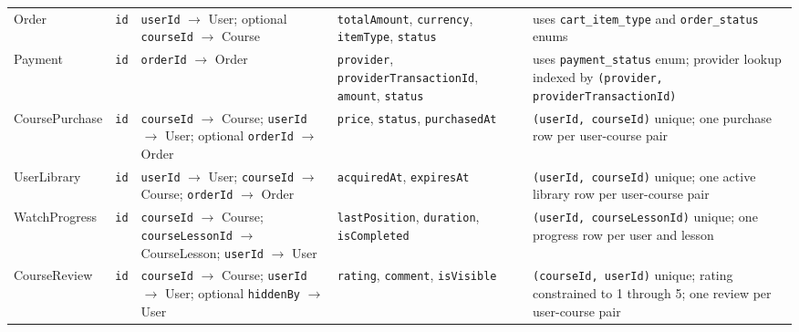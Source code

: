 \begin{longtable}{L{2.4cm}L{2.0cm}L{3.1cm}L{3.4cm}L{4.0cm}}
Order & \texttt{id} & \texttt{userId} $\rightarrow$ User; optional \texttt{courseId} $\rightarrow$ Course & \texttt{totalAmount}, \texttt{currency}, \texttt{itemType}, \texttt{status} & uses \texttt{cart\_item\_type} and \texttt{order\_status} enums \\
Payment & \texttt{id} & \texttt{orderId} $\rightarrow$ Order & \texttt{provider}, \texttt{providerTransactionId}, \texttt{amount}, \texttt{status} & uses \texttt{payment\_status} enum; provider lookup indexed by \texttt{(provider, providerTransactionId)} \\
CoursePurchase & \texttt{id} & \texttt{courseId} $\rightarrow$ Course; \texttt{userId} $\rightarrow$ User; optional \texttt{orderId} $\rightarrow$ Order & \texttt{price}, \texttt{status}, \texttt{purchasedAt} & \texttt{(userId, courseId)} unique; one purchase row per user-course pair \\
UserLibrary & \texttt{id} & \texttt{userId} $\rightarrow$ User; \texttt{courseId} $\rightarrow$ Course; \texttt{orderId} $\rightarrow$ Order & \texttt{acquiredAt}, \texttt{expiresAt} & \texttt{(userId, courseId)} unique; one active library row per user-course pair \\
WatchProgress & \texttt{id} & \texttt{courseId} $\rightarrow$ Course; \texttt{courseLessonId} $\rightarrow$ CourseLesson; \texttt{userId} $\rightarrow$ User & \texttt{lastPosition}, \texttt{duration}, \texttt{isCompleted} & \texttt{(userId, courseLessonId)} unique; one progress row per user and lesson \\
CourseReview & \texttt{id} & \texttt{courseId} $\rightarrow$ Course; \texttt{userId} $\rightarrow$ User; optional \texttt{hiddenBy} $\rightarrow$ User & \texttt{rating}, \texttt{comment}, \texttt{isVisible} & \texttt{(courseId, userId)} unique; rating constrained to 1 through 5; one review per user-course pair \\
\end{longtable}

